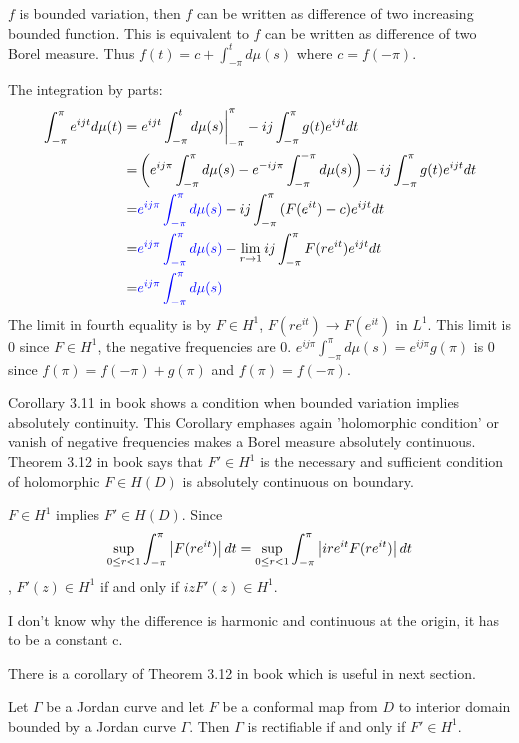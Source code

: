 \begin{remark}
    $f$ is bounded variation, then $f$ can be written as difference of two increasing bounded function. This is equivalent to $f$ can be written as
    difference of two Borel measure. Thus $f(t)=c+\int_{-\pi}^t{d\mu(s)}$ where $c=f(-\pi)$.\par
    The integration by parts:
    \begin{align*}
        \int_{-\pi}^\pi{e^{ijt}d\mu(t)}= & \left.e^{i j t}\int_{-\pi}^t{d\mu(s)}\right\rvert_{-\pi}^{\pi}-i j\int_{-\pi}^\pi{g(t)e^{ijt}dt}                         \\
        =                                & \left(e^{i j\pi}\int_{-\pi}^\pi{d\mu(s)}-e^{-i j\pi}\int_{-\pi}^{-\pi}{d\mu(s)}\right)-i j\int_{-\pi}^\pi{g(t)e^{ijt}dt} \\
        =                                & {\color{blue}e^{i j\pi}\int_{-\pi}^\pi{d\mu(s)}}-i j\int_{-\pi}^\pi{(F(e^{it})-c)e^{ijt}dt}                              \\
        =                                & {\color{blue}e^{i j\pi}\int_{-\pi}^\pi{d\mu(s)}}-\lim_{r\to 1}{i j\int_{-\pi}^\pi{F(re^{it})e^{ijt}dt}}                  \\
        =                                & {\color{blue}e^{i j\pi}\int_{-\pi}^\pi{d\mu(s)}}
    \end{align*}
    The limit in fourth equality is by $F\in H^1$, $F(re^{it})\to F(e^{it})$ in $L^1$. This limit is 0 since $F\in H^1$, the negative frequencies are 0.
    $e^{i j\pi}\int_{-\pi}^\pi{d\mu(s)}=e^{i j\pi}g(\pi)$ is 0 since $f(\pi)=f(-\pi)+g(\pi)$ and $f(\pi)=f(-\pi)$.
\end{remark}
Corollary 3.11 in book shows a condition when bounded variation implies absolutely continuity. This Corollary emphases again 'holomorphic condition' or
vanish of negative frequencies makes a Borel measure absolutely continuous. Theorem 3.12 in book says that $F'\in H^1$ is the necessary and
sufficient condition of holomorphic $F\in H(D)$ is absolutely continuous on boundary.
\begin{remark}
    $F\in H^1$ implies $F'\in H(D)$. Since
    \begin{equation*}
        \sup_{0\leq r<1}{\int_{-\pi}^{\pi}{\left\lvert F(re^{i t})\right\rvert d t}}=\sup_{0\leq r<1}{\int_{-\pi}^{\pi}{\left\lvert ire^{it}F(re^{i t})\right\rvert d t}}
    \end{equation*}
    , $F'(z)\in H^1$ if and only if $izF'(z)\in H^1$. \par
    {\color{blue} I don't know why the difference is harmonic and continuous at the origin, it has to be a constant
        c}.\par
\end{remark}\par
There is a corollary of Theorem 3.12 in book which is useful in next section.
\begin{corollary}
    Let $\Gamma$ be a Jordan curve and let $F$ be a conformal map from $D$ to interior domain bounded by a Jordan curve $\Gamma$. Then $\Gamma$ is rectifiable if and only if $F'\in H^1$.
\end{corollary}

% 
